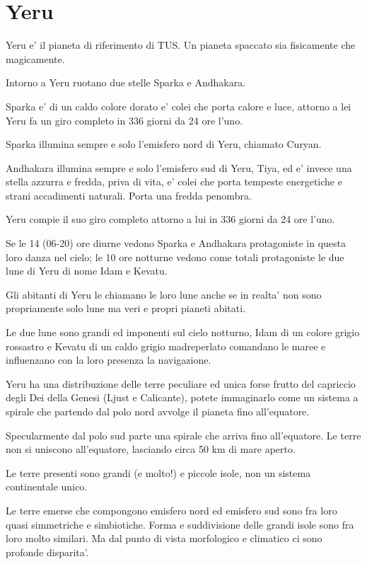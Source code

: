\documentclass[a4paper,11pt,twoside,openany]{book}
\begin{document}
\pagebreak

\section{Yeru}

\label{yeru}

Yeru e' il pianeta di riferimento di TUS. Un pianeta spaccato sia fisicamente che magicamente.

Intorno a Yeru ruotano due stelle Sparka e Andhakara.

Sparka e' di un caldo colore dorato e' colei che porta calore e luce, attorno a lei Yeru fa un giro completo in 336 giorni da 24 ore l'uno. 

Sparka illumina sempre e solo l'emisfero nord di Yeru, chiamato Curyan.

Andhakara illumina sempre e solo l'emisfero sud di Yeru, Tiya, ed e' invece una stella azzurra e fredda, priva di vita, e' colei che porta tempeste energetiche e strani accadimenti naturali. Porta una fredda penombra.

Yeru compie il suo giro completo attorno a lui in 336 giorni da 24 ore l'uno.

Se le 14 (06-20) ore diurne vedono Sparka e Andhakara protagoniste in questa loro danza nel cielo; le 10 ore notturne vedono come totali protagoniste le due lune di Yeru di nome Idam e Kevatu. 

Gli abitanti di Yeru le chiamano le loro lune anche se in realta' non sono propriamente solo lune ma veri e propri pianeti abitati.

Le due lune sono grandi ed imponenti sul cielo notturno, Idam di un colore grigio rossastro e Kevatu di un caldo grigio madreperlato comandano le maree e influenzano con la loro presenza la navigazione. 

Yeru ha una distribuzione delle terre peculiare ed unica forse frutto del capriccio degli Dei della Genesi (Ljust e Calicante), potete immaginarlo come un sistema a spirale che partendo dal polo nord avvolge il pianeta fino all'equatore. 

Specularmente dal polo sud parte una spirale che arriva fino all'equatore. Le terre non si uniscono all'equatore, lasciando circa 50 km di mare aperto.

Le terre presenti sono grandi (e molto!) e piccole isole, non un sistema continentale unico.

Le terre emerse che compongono emisfero nord ed emisfero sud sono fra loro quasi simmetriche e simbiotiche. Forma e suddivisione delle grandi isole sono fra loro molto similari. Ma dal punto di vista morfologico e climatico ci sono profonde disparita'.
\end{document}
